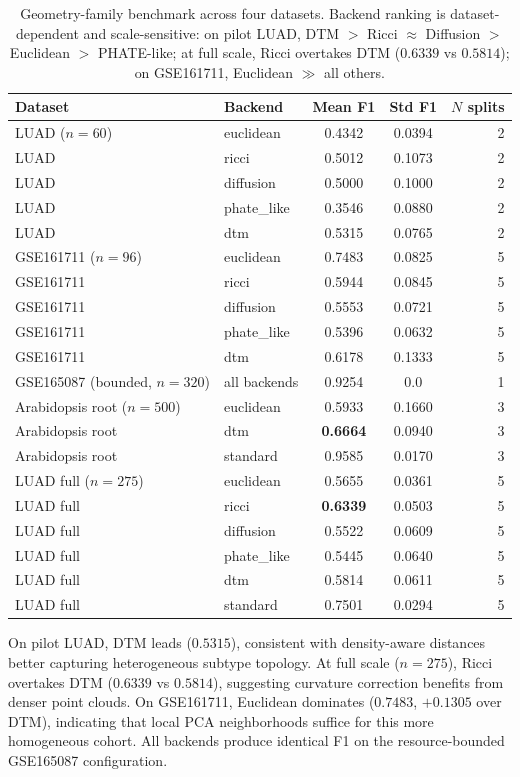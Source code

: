 \documentclass[12pt]{article}
\begin{document}
\begin{table}[h]
\centering
\small
\begin{tabular}{@{}llccr@{}}
\toprule
Dataset & Backend & Mean F1 & Std F1 & $N$ splits \\
\midrule
LUAD ($n=60$) & euclidean & 0.4342 & 0.0394 & 2 \\
LUAD & ricci & 0.5012 & 0.1073 & 2 \\
LUAD & diffusion & 0.5000 & 0.1000 & 2 \\
LUAD & phate\_like & 0.3546 & 0.0880 & 2 \\
LUAD & dtm & 0.5315 & 0.0765 & 2 \\
\midrule
GSE161711 ($n=96$) & euclidean & 0.7483 & 0.0825 & 5 \\
GSE161711 & ricci & 0.5944 & 0.0845 & 5 \\
GSE161711 & diffusion & 0.5553 & 0.0721 & 5 \\
GSE161711 & phate\_like & 0.5396 & 0.0632 & 5 \\
GSE161711 & dtm & 0.6178 & 0.1333 & 5 \\
\midrule
GSE165087 (bounded, $n=320$) & all backends & 0.9254 & 0.0 & 1 \\
\midrule
Arabidopsis root ($n=500$) & euclidean & 0.5933 & 0.1660 & 3 \\
Arabidopsis root & dtm & \textbf{0.6664} & 0.0940 & 3 \\
Arabidopsis root & standard & 0.9585 & 0.0170 & 3 \\
\midrule
LUAD full ($n=275$) & euclidean & 0.5655 & 0.0361 & 5 \\
LUAD full & ricci & \textbf{0.6339} & 0.0503 & 5 \\
LUAD full & diffusion & 0.5522 & 0.0609 & 5 \\
LUAD full & phate\_like & 0.5445 & 0.0640 & 5 \\
LUAD full & dtm & 0.5814 & 0.0611 & 5 \\
LUAD full & standard & 0.7501 & 0.0294 & 5 \\
\bottomrule
\end{tabular}
\caption{Geometry-family benchmark across four datasets.
Backend ranking is dataset-dependent and scale-sensitive: on pilot LUAD, DTM $>$ Ricci $\approx$ Diffusion $>$ Euclidean $>$ PHATE-like; at full scale, Ricci overtakes DTM ($0.6339$ vs $0.5814$); on GSE161711, Euclidean $\gg$ all others.}
\label{tab:geobench}
\end{table}

On pilot LUAD, DTM leads ($0.5315$), consistent with density-aware distances better capturing heterogeneous subtype topology.
At full scale ($n = 275$), Ricci overtakes DTM ($0.6339$ vs $0.5814$), suggesting curvature correction benefits from denser point clouds.
On GSE161711, Euclidean dominates ($0.7483$, $+0.1305$ over DTM), indicating that local PCA neighborhoods suffice for this more homogeneous cohort.
All backends produce identical F1 on the resource-bounded GSE165087 configuration.
\end{document}
